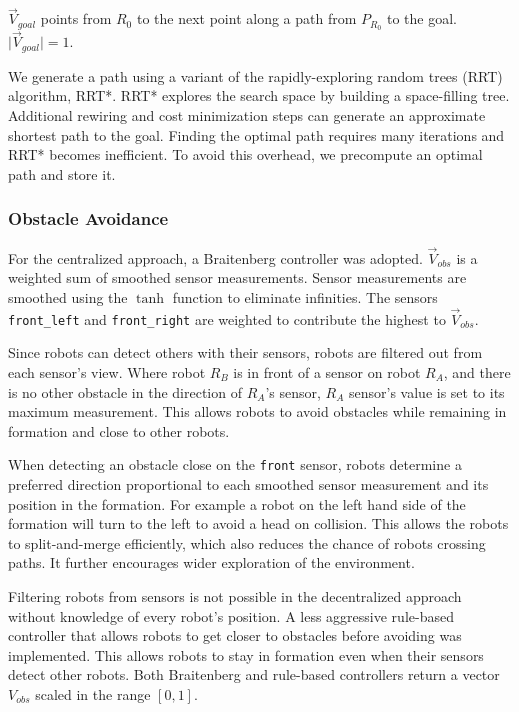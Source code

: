 \documentclass[letterpaper, 10 pt, conference]{ieeeconf}  %
\begin{document}
$\vec{V}_{goal}$ points from $R_0$ to the next point along a path from $P_{R_0}$ to the goal. $\vert\vec{V}_{goal}\rvert = 1$.

We generate a path using a variant of the rapidly-exploring random trees (RRT) algorithm, RRT*. RRT* explores the search space by building a space-filling tree. Additional rewiring and cost minimization steps can generate an approximate shortest path to the goal. Finding the optimal path requires many iterations and RRT* becomes inefficient. To avoid this overhead, we precompute an optimal path and store it.

\subsubsection*{Obstacle Avoidance}

For the centralized approach, a Braitenberg controller was adopted. $\vec{V}_{obs}$ is a weighted sum of smoothed sensor measurements. Sensor measurements are smoothed using the $\tanh$ function to eliminate infinities. The sensors \texttt{front\_left} and \texttt{front\_right} are weighted to contribute the highest to $\vec{V}_{obs}$. 

Since robots can detect others with their sensors, robots are filtered out from each sensor's view. Where robot $R_B$ is in front of a sensor on robot $R_A$, and there is no other obstacle in the direction of $R_A$'s sensor, $R_A$ sensor's value is set to its maximum measurement. This allows robots to avoid obstacles while remaining in formation and close to other robots.

When detecting an obstacle close on the \texttt{front} sensor, robots determine a preferred direction proportional to each smoothed sensor measurement and its position in the formation. For example a robot on the left hand side of the formation will turn to the left to avoid a head on collision. This allows the robots to split-and-merge efficiently, which also reduces the chance of robots crossing paths. It further encourages wider exploration of the environment.

Filtering robots from sensors is not possible in the decentralized approach without knowledge of every robot's position. A less aggressive rule-based controller that allows robots to get closer to obstacles before avoiding was implemented. This allows robots to stay in formation even when their sensors detect other robots. Both Braitenberg and rule-based controllers return a vector $V_{obs}$ scaled in the range $[0,1]$.
\end{document}
